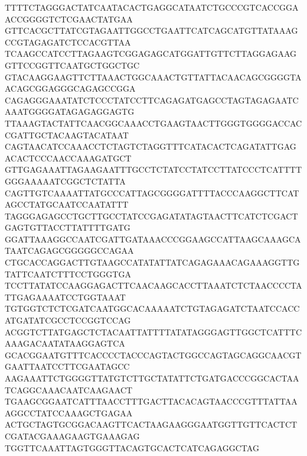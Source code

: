TTTTCTAGGGACTATCAATACACTGAGGCATAATCTGCCCGTCACCGGAACCGGGGTCTCGAACTATGAA
GTTCACGCTTATCGTAGAATTGGCCTGAATTCATCAGCATGTTATAAAGCCGTAGAGATCTCCACGTTAA
TCAAGCCATCCTTAGAAGTCGGAGAGCATGGATTGTTCTTAGGAGAAGGTTCCGGTTCAATGCTGGCTGC
GTACAAGGAAGTTCTTAAACTGGCAAACTGTTATTACAACAGCGGGGTAACAGCGGAGGGCAGAGCCGGA
CAGAGGGAAATATCTCCCTATCCTTCAGAGATGAGCCTAGTAGAGAATCAAATGGGGATAGAGAGGAGTG
TTAAAGTACTATTCAACGGCAAACCTGAAGTAACTTGGGTGGGGACCACCGATTGCTACAAGTACATAAT
CAGTAACATCCAAACCTCTAGTCTAGGTTTCATACACTCAGATATTGAGACACTCCCAACCAAAGATGCT
GTTGAGAAATTAGAAGAATTTGCCTCTATCCTATCCTTATCCCTCATTTTGGGAAAAATCGGCTCTATTA
CAGTTGTCAAAATTATGCCCATTAGCGGGGATTTTACCCAAGGCTTCATAGCCTATGCAATCCAATATTT
TAGGGAGAGCCTGCTTGCCTATCCGAGATATAGTAACTTCATCTCGACTGAGTGTTACCTTATTTTGATG
GGATTAAAGGCCAATCGATTGATAAACCCGGAAGCCATTAAGCAAAGCATAATCAGAGCGGGGGCCAGAA
CTGCACCAGGACTTGTAAGCCATATATTATCAGAGAAACAGAAAGGTTGTATTCAATCTTTCCTGGGTGA
TCCTTATATCCAAGGAGACTTCAACAAGCACCTTAAATCTCTAACCCCTATTGAGAAAATCCTGGTAAAT
TGTGGTCTCTCGATCAATGGCACAAAAATCTGTAGAGATCTAATCCACCATGATATCGCCTCCGGTCCAG
ACGGTCTTATGAGCTCTACAATTATTTTATATAGGGAGTTGGCTCATTTCAAAGACAATATAAGGAGTCA
GCACGGAATGTTTCACCCCTACCCAGTACTGGCCAGTAGCAGGCAACGTGAATTAATCCTTCGAATAGCC
AAGAAATTCTGGGGTTATGTCTTGCTATATTCTGATGACCCGGCACTAATCAGGCAAACAATCAAGAACT
TGAAGCGGAATCATTTAACCTTTGACTTACACAGTAACCCGTTTATTAAAGGCCTATCCAAAGCTGAGAA
ACTGCTAGTGCGGACAAGTTCACTAAGAAGGGAATGGTTGTTCACTCTCGATACGAAAGAAGTGAAAGAG
TGGTTCAAATTAGTGGGTTACAGTGCACTCATCAGAGGCTAG

